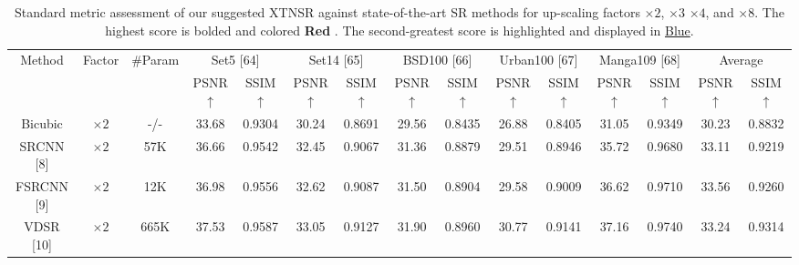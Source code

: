 \documentclass[twocolumn]{svjour3}          %
\begin{document}
\begin{table}
\caption{Standard metric assessment of our suggested XTNSR against state-of-the-art SR methods for up-scaling factors $\times 2$, $\times 3$ $\times 4$, and $\times 8$. The highest score is bolded and colored {\color{red}\textbf{Red }}. The second-greatest score is highlighted and displayed in {\color{blue}\underline{Blue}}.}

\label{table1}
\setlength{\tabcolsep}{2 pt}
\begin{tabular}{|c|c|c|cc|cc|cc|cc|cc|cc|}
\hline
\multirow{2}{*}{Method} & \multirow{2}{*}{Factor} & \multirow{2}{*}{\#Param}& \multicolumn{2}{c|}{Set5 [64]}& \multicolumn{2}{c|}{Set14 [65]}& \multicolumn{2}{c|}{BSD100 [66]}& \multicolumn{2}{c|}{Urban100 [67]}& \multicolumn{2}{c|}{Manga109 [68]}& \multicolumn{2}{c|}{Average}\\


 \cline{4-15}&&& \multicolumn{1}{c|}{PSNR$\uparrow$}  & SSIM{$\uparrow$}   & \multicolumn{1}{c|}{PSNR$\uparrow$}  & SSIM {$\uparrow$}   & \multicolumn{1}{c|}{PSNR$\uparrow$}  & SSIM {$\uparrow$}   & \multicolumn{1}{c|}{PSNR$\uparrow$}  & SSIM {$\uparrow$}  & \multicolumn{1}{c|}{PSNR$\uparrow$}  & SSIM {$\uparrow$}   & \multicolumn{1}{c|}{PSNR$\uparrow$}  & SSIM {$\uparrow$}  \\
 \hline

Bicubic&$\times2$ & -/-& \multicolumn{1}{c|}{33.68 } & 0.9304  & \multicolumn{1}{c|}{30.24 } &0.8691  & \multicolumn{1}{c|}{29.56 } & 0.8435  & \multicolumn{1}{c|}{26.88 } & 0.8405  & \multicolumn{1}{c|}{31.05 } & 0.9349&
\multicolumn{1}{c|}{30.23} & 0.8832 \\


SRCNN [8] & $\times 2$ & 57K& \multicolumn{1}{c|}{36.66 } & 0.9542  & \multicolumn{1}{c|}{32.45 } & 0.9067  &\multicolumn{1}{c|}{31.36 } & 0.8879  & \multicolumn{1}{c|}{29.51 } &0.8946 & \multicolumn{1}{c|}{35.72} &0.9680
&\multicolumn{1}{c|}{33.11} & 0.9219\\

FSRCNN [9]& $\times 2$& 12K & \multicolumn{1}{c|}{36.98} &0.9556& \multicolumn{1}{c|}{32.62} & 0.9087 &\multicolumn{1}{c|}{31.50} &0.8904& \multicolumn{1}{c|}{29.58} &0.9009& \multicolumn{1}{c|}{36.62} &0.9710
&\multicolumn{1}{c|}{33.56} & 0.9260\\

VDSR [10]& $\times 2$&665K& \multicolumn{1}{c|}{37.53} & 0.9587 & \multicolumn{1}{c|}{33.05} & 0.9127 &\multicolumn{1}{c|}{31.90} & 0.8960& \multicolumn{1}{c|}{30.77} & 0.9141 & \multicolumn{1}{c|}{37.16} & 0.9740
&\multicolumn{1}{c|}{33.24} & 0.9314\\


\end{tabular}
\end{table}
\end{document}
